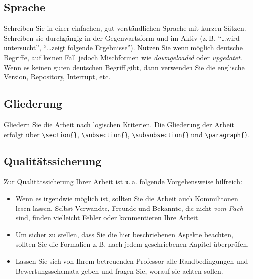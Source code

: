 \documentclass[conference,compsoc,final,a4paper]{IEEEtran}
\begin{document}
\subsection{Sprache}
Schreiben Sie in einer einfachen, gut verständlichen Sprache mit kurzen Sätzen. Schreiben sie durchgängig in der Gegenwartsform und im Aktiv (z.\,B. \enquote{\dots wird untersucht}, \enquote{\dots zeigt folgende Ergebnisse}). Nutzen Sie wenn möglich deutsche Begriffe, auf keinen Fall jedoch Mischformen wie \emph{downgeloaded} oder \emph{upgedatet}. Wenn es keinen guten deutschen Begriff gibt, dann verwenden Sie die englische Version, \zb Repository, Interrupt, etc.

\subsection{Gliederung}
Gliedern Sie die Arbeit nach logischen Kriterien. Die Gliederung der Arbeit erfolgt über \lstinline+\section{}+, \lstinline+\subsection{}+, \lstinline+\subsubsection{}+ und \lstinline+\paragraph{}+.

\subsection{Qualitätssicherung}
Zur Qualitätssicherung Ihrer Arbeit ist u.\,a. folgende Vorgehensweise hilfreich:
\begin{itemize}
\item Wenn es irgendwie möglich ist, sollten Sie die Arbeit auch Kommilitonen lesen lassen. Selbst Verwandte, Freunde und Bekannte, die nicht \emph{vom Fach} sind, finden vielleicht Fehler oder kommentieren Ihre Arbeit.
\item Um sicher zu stellen, dass Sie die hier beschriebenen Aspekte beachten, sollten Sie die Formalien z.\,B. nach jedem geschriebenen Kapitel überprüfen.
\item Lassen Sie sich von Ihrem betreuenden Professor alle Randbedingungen und Bewertungsschemata geben und fragen Sie, worauf sie achten sollen.
\end{itemize}
\end{document}
